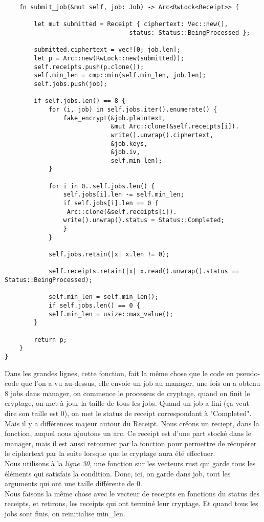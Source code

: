 \documentclass{article}
\begin{document}
\begin{lstlisting}
    fn submit_job(&mut self, job: Job) -> Arc<RwLock<Receipt>> {

        let mut submitted = Receipt { ciphertext: Vec::new(),
                                  status: Status::BeingProcessed };

        submitted.ciphertext = vec![0; job.len];
        let p = Arc::new(RwLock::new(submitted));
        self.receipts.push(p.clone());
        self.min_len = cmp::min(self.min_len, job.len);
        self.jobs.push(job);

        if self.jobs.len() == 8 {
            for (i, job) in self.jobs.iter().enumerate() {
                fake_encrypt(&job.plaintext,
                             &mut Arc::clone(&self.receipts[i]).
                             write().unwrap().ciphertext,
                             &job.keys,
                             &job.iv,
                             self.min_len);
            }

            for i in 0..self.jobs.len() {
                self.jobs[i].len -= self.min_len;
                if self.jobs[i].len == 0 {
                 Arc::clone(&self.receipts[i]).
                write().unwrap().status = Status::Completed;
                }
            }

            self.jobs.retain(|x| x.len != 0);
            
            self.receipts.retain(|x| x.read().unwrap().status == Status::BeingProcessed);

            self.min_len = self.min_len();
            if self.jobs.len() == 0 {
            self.min_len = usize::max_value();
        }

        return p;
    }
}
\end{lstlisting}

Dans les grandes lignes, cette fonction, fait la même chose que le code en pseudo-code que l'on a vu au-dessus, elle envoie un job au manager, une fois on a obtenu 8 jobs dans manager, on commence le processus de cryptage, quand on finit le cryptage, on met à jour la taille de tous les jobs. Quand un job a fini (ça veut dire son taille est 0), on met le status de receipt correspondant à "Completed".\\
Mais il y a différences majeur autour du Receipt. Nous créons un reciept, dans la fonction, auquel nous ajoutons un arc. Ce receipt est d'une part stocké dans le manager, mais il est aussi retourner par la fonction pour permettre de récupérer le ciphertext par la suite lorsque que le cryptage aura été effectuer. \\
Nous utilisons à la \textit{ligne 30}, une fonction sur les vecteurs rust qui garde tous les éléments qui satisfais  la condition. Donc, ici, on garde dans job, tout les arguments qui ont une taille différente de 0. \\
Nous faisons la même chose avec le vecteur de receipts en fonctions du status des receipts, et retirons, les receipts qui ont terminé leur cryptage.
Et quand tous les jobs sont finis, on reinitialise min\_len. 
\end{document}
